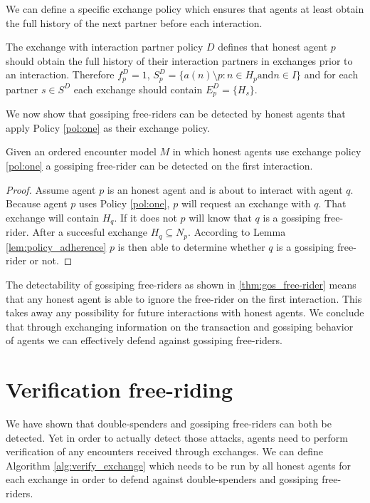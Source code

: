 We can define a specific exchange policy which ensures that agents at least obtain the full history 
of the next partner before each interaction. 

\begin{pol}
    \label{pol:one}
    The exchange with interaction partner policy $D$ defines that honest agent $p$ should obtain the full 
    history of their interaction partners in exchanges prior to an interaction. Therefore 
    $f^D_p=1$, $S^D_p = \{ a(n) \setminus p : n \in H_p \text{and} n \in I \}$
    and for each partner $s \in S^D$ each exchange should contain $E^D_p = \{ H_s \}$.
\end{pol}

We now show that gossiping free-riders can be detected by honest agents that apply Policy \ref{pol:one}
as their exchange policy.
\begin{thm}
    \label{thm:gos_free-rider}
    Given an ordered encounter model $M$ in which honest agents use exchange policy \ref{pol:one}
    a gossiping free-rider can be detected on the first interaction.
\end{thm}
\begin{proof}
    Assume agent $p$ is an honest agent and is about to interact with agent $q$. Because agent $p$
    uses Policy \ref{pol:one}, $p$ will request an exchange with $q$. That exchange will contain 
    $H_q$. If it does not $p$ will know that $q$ is a gossiping free-rider. After a succesful
    exchange $H_q \subseteq N_p$. According to Lemma \ref{lem:policy_adherence} $p$ is then able to
    determine whether $q$ is a gossiping free-rider or not. 
\end{proof}

The detectability of gossiping free-riders as shown in \ref{thm:gos_free-rider} means that any 
honest agent is able to ignore the free-rider on the first interaction. This takes away any 
possibility for future interactions with honest agents. We conclude that through exchanging
information on the transaction and gossiping behavior of agents we can effectively defend against 
gossiping free-riders.

\section{Verification free-riding}
We have shown that double-spenders and gossiping free-riders can both be detected. Yet in order to 
actually detect those attacks, agents need to perform verification of any encounters received 
through exchanges. We can define Algorithm \ref{alg:verify_exchange} which needs to be run by all 
honest agents for each exchange in order to defend against double-spenders and gossiping free-riders.

